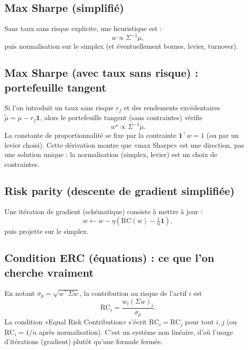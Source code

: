 \documentclass[11pt,a4paper]{report}
\theoremstyle{definition}
\theoremstyle{plain}
\theoremstyle{remark}
\newcommand{\1}{\mathbf{1}}
\begin{document}
\subsection*{Max Sharpe (simplifié)}
Sans taux sans risque explicite, une heuristique est :
\[
w \propto \Sigma^{-1}\mu,
\]
puis normalisation sur le simplex (et éventuellement bornes, levier, turnover).

\subsection*{Max Sharpe (avec taux sans risque) : portefeuille tangent}
Si l'on introduit un taux sans risque $r_f$ et des rendements excédentaires $\tilde\mu=\mu-r_f\bm{1}$, alors le portefeuille tangent (sans contraintes) vérifie
\[
w^\star \propto \Sigma^{-1}\tilde\mu.
\]
La constante de proportionnalité se fixe par la contrainte $\bm{1}^\top w=1$ (ou par un levier choisi).
Cette dérivation montre que «max Sharpe» est une direction, pas une solution unique : la normalisation (simplex, levier) est un choix de contraintes.

\subsection*{Risk parity (descente de gradient simplifiée)}
Une itération de gradient (schématique) consiste à mettre à jour :
\[
w \leftarrow w - \eta(\text{RC}(w)-\tfrac1n\bm{1}),
\]
puis projette sur le simplex.

\subsection*{Condition ERC (équations) : ce que l'on cherche vraiment}
En notant $\sigma_p=\sqrt{w^\top\Sigma w}$, la contribution au risque de l'actif $i$ est
\[
\text{RC}_i=\frac{w_i(\Sigma w)_i}{\sigma_p}.
\]
La condition «Equal Risk Contribution» s'écrit $\text{RC}_i=\text{RC}_j$ pour tout $i,j$ (ou $\text{RC}_i=1/n$ après normalisation).
C'est un système non linéaire, d'où l'usage d'itérations (gradient) plutôt qu'une formule fermée.
\end{document}
